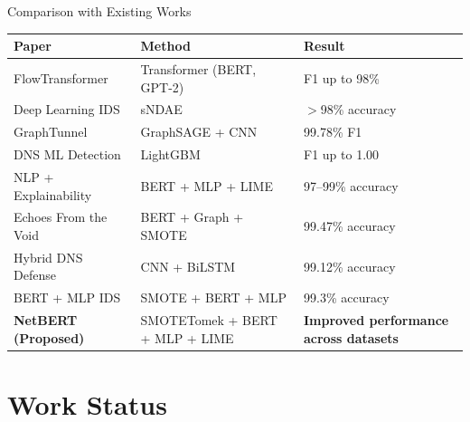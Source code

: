 \documentclass[aspectratio=169,xcolor=dvipsnames]{beamer}
\begin{document}
\begin{frame}{Comparison with Existing Works}
\centering
\scriptsize
\begin{tabular}{|p{3cm}|p{2cm}|p{2cm}|}
\hline
\textbf{Paper} & \textbf{Method} & \textbf{Result} \\ \hline

FlowTransformer &
Transformer (BERT, GPT-2) &
F1 up to 98\% \\ \hline

Deep Learning IDS &
sNDAE &
$>$98\% accuracy \\ \hline

GraphTunnel &
GraphSAGE + CNN &
99.78\% F1 \\ \hline

DNS ML Detection &
LightGBM &
F1 up to 1.00 \\ \hline

NLP + Explainability &
BERT + MLP + LIME &
97–99\% accuracy \\ \hline

Echoes From the Void &
BERT + Graph + SMOTE &
99.47\% accuracy \\ \hline

Hybrid DNS Defense &
CNN + BiLSTM &
99.12\% accuracy \\ \hline

BERT + MLP IDS &
SMOTE + BERT + MLP &
99.3\% accuracy \\ \hline

\textbf{NetBERT (Proposed)} &
SMOTETomek + BERT + MLP + LIME &
\textbf{Improved performance across datasets} \\ \hline


\end{tabular}

\end{frame}

\section{Work Status}
\end{document}

